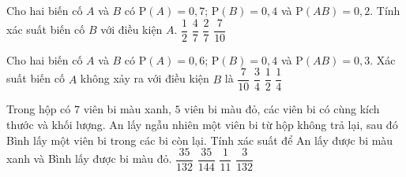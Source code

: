 \begin{ex}%
	Cho hai biến cố $A$ và $B$ có $\mathrm{P}\left(A\right) = 0{,}7$; $\mathrm{P}\left(B\right) = 0{,}4$ và
	$\mathrm{P}\left(AB\right)=0{,}2$. Tính xác suất biến cố $B$ với điều kiện $A$. 
	\choice
	{$\dfrac{1}{2}$}
	{$\dfrac{4}{7}$}
	{\True $\dfrac{2}{7}$}
	{$\dfrac{7}{10}$}
\end{ex}
\begin{ex}%
	Cho hai biến cố $A$ và $B$ có $\mathrm{P}\left(A\right) = 0{,}6$; $\mathrm{P}\left(B\right) = 0{,}4$ và $\mathrm{P}\left(AB\right)=0{,}3$. Xác suất biến cố $A$ không xảy ra với điều kiện $B$ là 
	\choice
	{$\dfrac{7}{10}$}
	{$\dfrac{3}{4}$}
	{$\dfrac{1}{2}$}
	{\True $\dfrac{1}{4}$}
\end{ex}
\begin{ex}%
	Trong hộp có $7$ viên bi màu xanh, $5$ viên bi màu đỏ, các viên bi có cùng kích thước và khối lượng. An lấy ngẫu nhiên một viên bi từ hộp không trả lại, sau đó Bình lấy một viên bi trong các bi còn lại. Tính xác suất để An lấy được bi màu xanh và Bình lấy được bi màu đỏ.
	\choice
	{\True $\dfrac{35}{132}$}
	{$\dfrac{35}{144}$}
	{$\dfrac{1}{11}$}
	{$\dfrac{3}{132}$}
\end{ex}
